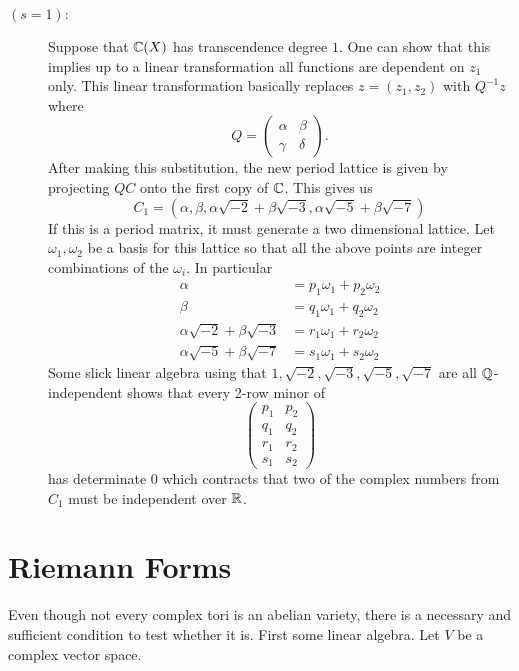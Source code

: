 \documentclass[11pt]{article}
\begin{document}
\begin{ex}
\begin{description}
		\item[$(s=1):$]
			Suppose that $\mathbb{C}(X)$ has transcendence degree $1$. One can show that this implies up to a linear transformation all functions are dependent on $z_1$ only. This linear transformation basically replaces $z = (z_1,z_2)$ with $Q^{-1}z$ where
			$$
			Q = \begin{pmatrix}
				\alpha & \beta
				\\
				\gamma & \delta
			\end{pmatrix}.
			$$
			After making this substitution, the new period lattice is given by projecting $QC$ onto the first copy of $\mathbb{C}$. This gives us
			$$
			C_1 =
			\left(
				\alpha,\beta,\alpha\sqrt{-2} + \beta\sqrt{-3}, \alpha\sqrt{-5} + \beta\sqrt{-7}
			\right)
			$$
			If this is a period matrix, it must generate a two dimensional lattice. Let $\omega_1,\omega_2$ be a basis for this lattice so that all the above points are integer combinations of the $\omega_i$. In particular
			\begin{align*}
				\alpha &= p_1\omega_1 + p_2 \omega_2
				\\
				\beta &= q_1\omega_1 + q_2 \omega_2
				\\
				\alpha\sqrt{-2} + \beta\sqrt{-3} &= r_1\omega_1 + r_2 \omega_2
				\\
				\alpha\sqrt{-5} + \beta\sqrt{-7} &= s_1\omega_1 + s_2 \omega_2
			\end{align*}
			Some slick linear algebra using that $1,\sqrt{-2},\sqrt{-3},\sqrt{-5},\sqrt{-7}$ are all $\mathbb{Q}$-independent shows that every 2-row minor of
			$$
			\begin{pmatrix}
				p_1 & p_2
				\\
				q_1 & q_2
				\\
				r_1 & r_2
				\\
				s_1 & s_2
			\end{pmatrix}
			$$
			has determinate $0$ which contracts that two of the complex numbers from $C_1$ must be independent over $\mathbb{R}$.
	\end{description}
\end{ex}

\section{Riemann Forms}

Even though not every complex tori is an abelian variety, there is a necessary and sufficient condition to test whether it is. First some linear algebra. Let $V$ be a complex vector space.
\end{document}
